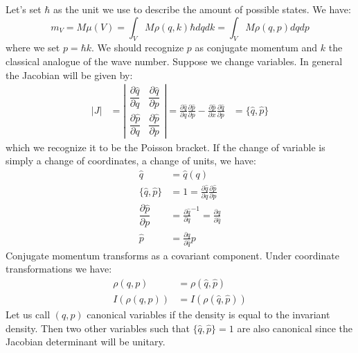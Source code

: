 \documentclass[11pt]{article}
\begin{document}
Let's set $\hbar$ as the unit we use to describe the amount of possible states. We have:
\begin{equation}
m_V = M \mu(V) =\int_V M \rho(q, k) \hbar dq dk = \int_V M \rho(q, p) dq dp
\end{equation}
where we set $p=\hbar k$. We should recognize $p$ as conjugate momentum and $k$ the classical analogue of the wave number. Suppose we change variables. In general the Jacobian will be given by:
\begin{equation}
\label{Poisson}
\begin{aligned}
|J| &= \left| \begin{matrix}
\dfrac{\partial \hat{q}}{\partial q} & \dfrac{\partial \hat{q}}{\partial p} \\[2.2ex]
\dfrac{\partial \hat{p}}{\partial q} & \dfrac{\partial \hat{p}}{\partial p} \end{matrix} \right| = \frac{\partial \hat{q}}{\partial q} \frac{\partial \hat{p}}{\partial p} - \frac{\partial \hat{p}}{\partial x} \frac{\partial \hat{q}}{\partial p} &= \{\hat{q}, \hat{p}\}
\end{aligned}
\end{equation}
which we recognize it to be the Poisson bracket. If the change of variable is simply a change of coordinates, a change of units, we have:
\begin{equation}
\label{coordinate_change}
\begin{aligned}
\hat{q} &= \hat{q}(q) \\
\{\hat{q}, \hat{p}\} &= 1 = \frac{\partial \hat{q}}{\partial q} \frac{\partial \hat{p}}{\partial p} \\
\dfrac{\partial \hat{p}}{\partial p} &= \frac{\partial \hat{q}}{\partial q} ^{-1} = \frac{\partial q}{\partial \hat{q}} \\
\hat{p} &= \frac{\partial q}{\partial \hat{q}} p
\end{aligned}
\end{equation}
Conjugate momentum transforms as a covariant component. Under coordinate transformations we have:
\begin{equation}
\label{density_invariance}
\begin{aligned}
\rho(q,p) &= \rho(\hat{q}, \hat{p}) \\
I(\rho(q,p)) &= I(\rho(\hat{q},\hat{p}))
\end{aligned}
\end{equation}
Let us call $(q,p)$ canonical variables if the density is equal to the invariant density. Then two other variables such that $\{\hat{q}, \hat{p}\}=1$ are also canonical since the Jacobian determinant will be unitary.
\end{document}
